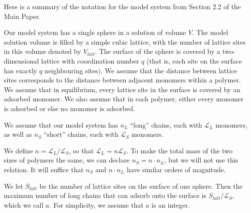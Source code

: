 \documentclass[journal=mamobx,manuscript=article]{achemso}
\newcommand{\leng}{\mathcal{L}}
\begin{document}
Here is a summary of the notation for the model system 
from Section 2.2 of the Main Paper.

Our model system has a single sphere in a solution of
volume $V$.  The model solution volume is filled by a 
simple cubic lattice, with the number of lattice sites in this volume denoted by $V_{latt}$.
The surface of the sphere is covered by a  two-dimensional lattice with coordination number $q$ 
(that is, each site on the surface has exactly $q$ neighbouring sites).  We assume that 
the distance between lattice sites corresponds to the distance between adjacent monomers within a 
polymer.  We assume that in equilibrium, every lattice site in the surface is covered by an adsorbed 
monomer.  We also assume that in each polymer, either every 
monomer is adsorbed or else no monomer is adsorbed.
 



We assume that our model system has $n_L$ ``long'' chains, each
with $\leng_L$ monomers, as well as $n_S$ ``short''
chains, each with $\leng_S$ monomers.

We define $n=\leng_L/\leng_S$, so that $\leng_L=n\leng_S$.   To make the total mass
of the two sizes of polymers the same, we can
declare $n_S=n \cdot n_L$, but we will not use
this relation.  It will suffice that $n_S$ and 
$n\cdot n_L$ have similar orders of magnitude.

We let $S_{latt}$ be the number of lattice sites on 
the surface of one sphere.  Then the maximum number of 
long chains that can adsorb onto the surface is 
$S_{latt}/\leng_S$, which we call $a$. For 
simplicity, we assume that $a$ is an integer.


\end{document}
